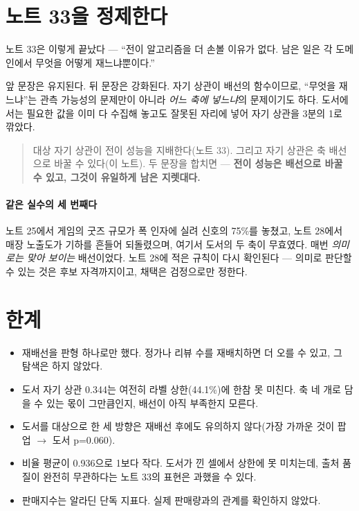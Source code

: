 \documentclass[10pt]{article}
\begin{document}
\section{노트 33을 정제한다}

노트 33은 이렇게 끝났다 --- ``전이 알고리즘을 더 손볼 이유가 없다. 남은 일은
각 도메인에서 무엇을 어떻게 재느냐뿐이다.''

앞 문장은 유지된다. 뒤 문장은 강화된다. 자기 상관이 배선의 함수이므로,
``무엇을 재느냐''는 관측 가능성의 문제만이 아니라 \emph{어느 축에 넣느냐}의
문제이기도 하다. 도서에서는 필요한 값을 이미 다 수집해 놓고도 잘못된 자리에
넣어 자기 상관을 3분의 1로 깎았다.

\begin{quote}\fontsize{9.5}{11.5}\selectfont
대상 자기 상관이 전이 성능을 지배한다(노트 33). 그리고 자기 상관은 축 배선으로
바꿀 수 있다(이 노트). 두 문장을 합치면 --- \textbf{전이 성능은 배선으로 바꿀 수
있고, 그것이 유일하게 남은 지렛대다.}
\end{quote}

\paragraph{같은 실수의 세 번째다}
노트 25에서 게임의 굿즈 규모가 폭 인자에 실려 신호의 75\%를 놓쳤고, 노트 28에서
매장 노출도가 기하를 흔들어 되돌렸으며, 여기서 도서의 두 축이 무효였다.
매번 \emph{의미로는 맞아 보이는} 배선이었다. 노트 28에 적은 규칙이 다시 확인된다
--- 의미로 판단할 수 있는 것은 후보 자격까지이고, 채택은 검정으로만 정한다.

\section{한계}

\begin{itemize}[leftmargin=1.1em,itemsep=0.15em]
\item 재배선을 판형 하나로만 했다. 정가나 리뷰 수를 재배치하면 더 오를 수 있고,
      그 탐색은 하지 않았다.
\item 도서 자기 상관 0.344는 여전히 라벨 상한(44.1\%)에 한참 못 미친다. 축
      네 개로 담을 수 있는 몫이 그만큼인지, 배선이 아직 부족한지 모른다.
\item 도서를 대상으로 한 세 방향은 재배선 후에도 유의하지 않다(가장 가까운 것이
      팝업 $\to$ 도서 p=0.060).
\item 비율 평균이 0.936으로 1보다 작다. 도서가 낀 셀에서 상한에 못 미치는데,
      출처 품질이 완전히 무관하다는 노트 33의 표현은 과했을 수 있다.
\item 판매지수는 알라딘 단독 지표다. 실제 판매량과의 관계를 확인하지 않았다.
\end{itemize}
\end{document}
